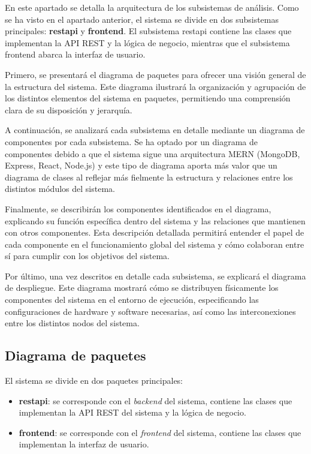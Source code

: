 
En este apartado se detalla la arquitectura de los subsistemas de análisis. Como se ha visto en el apartado anterior, el sistema se divide en dos subsistemas principales: 
\textbf{restapi} y \textbf{frontend}. El subsistema restapi contiene las clases que implementan la API REST y la lógica de negocio, mientras que el subsistema frontend abarca la interfaz de usuario.

Primero, se presentará el diagrama de paquetes para ofrecer una visión general de la estructura del sistema. Este diagrama ilustrará la organización y 
agrupación de los distintos elementos del sistema en paquetes, permitiendo una comprensión clara de su disposición y jerarquía.

A continuación, se analizará cada subsistema en detalle mediante un diagrama de componentes por cada subsistema. Se ha optado por un diagrama de componentes debido a que el sistema sigue una arquitectura MERN 
(MongoDB, Express, React, Node.js) y este tipo de diagrama aporta más valor que un diagrama de clases al reflejar más fielmente la estructura y relaciones entre los distintos módulos del sistema.

Finalmente, se describirán los componentes identificados en el diagrama, explicando su función específica dentro del sistema y las relaciones que mantienen con otros componentes. 
Esta descripción detallada permitirá entender el papel de cada componente en el funcionamiento global del sistema y cómo colaboran entre sí para cumplir con los objetivos del sistema.

Por último, una vez descritos en detalle cada subsistema, se explicará el diagrama de despliegue. Este diagrama mostrará cómo se distribuyen físicamente los componentes del sistema en el entorno de 
ejecución, especificando las configuraciones de hardware y software necesarias, así como las interconexiones entre los distintos nodos del sistema.


\subsection{Diagrama de paquetes} 
El sistema se divide en dos paquetes principales:
\begin{itemize}
    \item \textbf{restapi}: se corresponde con el \textit{backend} del sistema, contiene las clases que implementan la API REST del sistema y la lógica de negocio.
    \item \textbf{frontend}: se corresponde con el \textit{frontend} del sistema, contiene las clases que implementan la interfaz de usuario.
\end{itemize}

